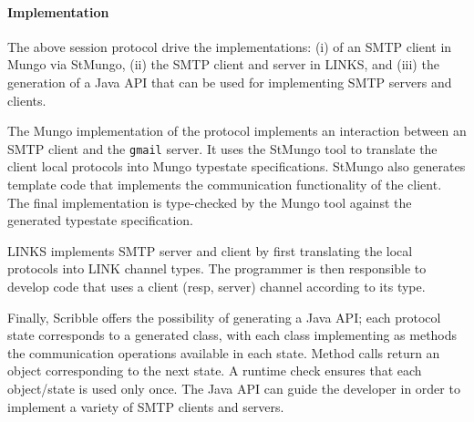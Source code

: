 
%


%

\paragraph{Implementation}
The above session protocol drive the implementations:
(i) of an SMTP client in Mungo via StMungo,
(ii) the SMTP client and server in LINKS, and
(iii) the generation of a Java API that can be used
for implementing SMTP servers and clients.

The Mungo implementation of the protocol
implements an interaction between an SMTP client
and the \lstinline|gmail| server. It uses the StMungo
tool to translate the client local protocols into Mungo
typestate specifications. StMungo also generates template
code that implements the communication functionality of the client.
The final implementation is type-checked by the Mungo tool against
the generated typestate specification.

LINKS implements SMTP server and client by first translating
the local protocols into LINK channel types. The programmer
is then responsible to develop code that uses a client (resp, server)
channel according to its type.

Finally, Scribble offers the possibility of generating a Java API;
each protocol state corresponds to a generated class, with each
class implementing as methods the communication operations available
in each state. Method calls return an object corresponding to the next state.
A runtime check ensures that each object/state is used only once.
The Java API can guide the developer in order to implement a variety
of SMTP clients and servers.